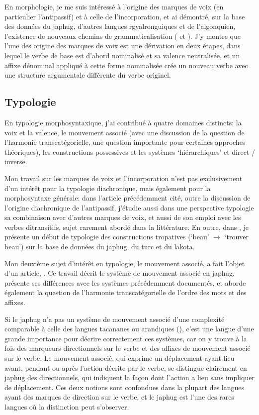 \documentclass[oldfontcommands,oneside,a4paper,11pt]{article}
\begin{document}
En morphologie, je me suis intéressé à l'origine des marques de voix (en particulier l'antipassif) et à celle de l'incorporation, et ai démontré, sur la base des données du japhug, d'autres langues rgyalronguiques et de l'algonquien, l'existence de nouveaux chemins de grammaticalisation  (\citealt{jacques12incorp} et \citealt{jacques14antipassive}). J'y montre que l'une des origine des marques de voix est une dérivation en deux étapes, dans lequel le verbe de base est d'abord nominalisé et sa valence neutralisée, et  un affixe dénominal appliqué à cette forme nominalisée crée un nouveau verbe avec une structure argumentale différente du verbe originel. 

 
 
\subsection{Typologie}  \label{sec:typologie}
En typologie morphosyntaxique, j'ai contribué à quatre domaines distincts: la voix et la valence, le mouvement associé (avec une discussion de la question de l'harmonie transcatégorielle, une question importante pour certaines approches théoriques), les constructions possessives et les systèmes  `hiérarchiques' et direct / inverse.

Mon travail sur les marques de voix et l'incorporation n'est pas exclusivement d'un intérêt pour la typologie diachronique, mais également pour la morphosyntaxe générale: dans l'article \citet{jacques14antipassive} précédemment cité, outre la discussion de l'origine diachronique de l'antipassif, j'étudie aussi dans une perspective typologie sa combinaison avec d'autres marques de voix, et aussi de son emploi avec les verbes ditransitifs, sujet rarement abordé dans la littérature. En outre, dans \citet{jacques13tropative}, je présente un début de typologie des constructions tropatives (`beau' $\rightarrow$ `trouver beau') sur la base de données du japhug, du turc et du lakota. 

Mon deuxième sujet d'intérêt en typologie, le mouvement associé, a fait l'objet d'un article,  \citet{jacques13harmonization}. Ce travail décrit le système  de mouvement associé en japhug, présente ses différences avec les systèmes précédemment documentés, et aborde également la question de l'harmonie transcatégorielle de l'ordre des mots et des affixes. 

Si  le japhug n'a pas un système de mouvement associé d'une complexité comparable à celle des langues tacananes ou arandiques (\citealt{guillaume09mouv.assoc}), c'est une langue d'une grande importance pour décrire correctement ces systèmes, car on y trouve à la fois des marqueurs directionnels sur le verbe et des affixes de mouvement associé sur le verbe. Le mouvement associé, qui exprime  un déplacement ayant lieu avant, pendant ou après l'action décrite par le verbe, se distingue clairement en japhug  des directionnels, qui indiquent la façon dont l'action a lieu sans impliquer de déplacement. Ces deux notions sont confondues dans la plupart des langues ayant des marques de direction sur le verbe, et le japhug est l'une des rares langues où la distinction peut s'observer.
\end{document}
